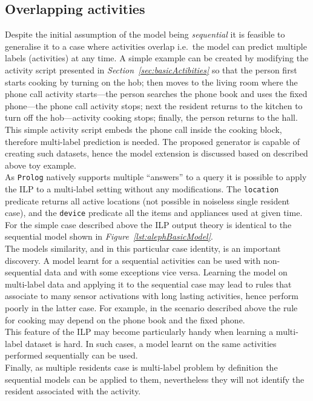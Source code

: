 \documentclass[10pt, a4paper, pdflatex, leqno, twoside, openright]{report}
\begin{document}
    \subsection{Overlapping activities\label{sec:singleML}}
Despite the initial assumption of the model being \emph{sequential} it is feasible to generalise it to a case where activities overlap i.e.\ the model can predict multiple labels (activities) at any time. A simple example can be created by modifying the activity script presented in \emph{Section~\ref{sec:basicActibities}} so that the person first starts cooking by turning on the hob; then moves to the living room where the phone call activity starts---the person searches the phone book and uses the fixed phone---the phone call activity stops; next the resident returns to the kitchen to turn off the hob---activity cooking stops; finally, the person returns to the hall.\\
This simple activity script embeds the phone call inside the cooking block, therefore multi-label prediction is needed. The proposed generator is capable of creating such datasets, hence the model extension is discussed based on described above toy example.\\

As \texttt{Prolog} natively supports multiple ``answers'' to a query it is possible to apply the ILP to a multi-label setting without any modifications. The \texttt{location} predicate returns all active locations (not possible in noiseless single resident case), and the \texttt{device} predicate all the items and appliances used at given time. For the simple case described above the ILP output theory is identical to the sequential model shown in \emph{Figure~\ref{lst:alephBasicModel}}.\\

The models similarity, and in this particular case identity, is an important discovery. A model learnt for a sequential activities can be used with non-sequential data and with some exceptions vice versa. Learning the model on multi-label data and applying it to the sequential case may lead to rules that associate to many sensor activations with long lasting activities, hence perform poorly in the latter case. For example, in the scenario described above the rule for cooking may depend on the phone book and the fixed phone.\\
This feature of the ILP may become particularly handy when learning a multi-label dataset is hard. In such cases, a model learnt on the same activities performed sequentially can be used.\\
Finally, as multiple residents case is multi-label problem by definition the sequential models can be applied to them, nevertheless they will not identify the resident associated with the activity.
\end{document}
